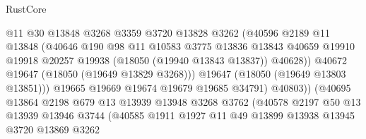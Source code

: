 \begin{lexlean}{RustCore}
\begin{coremodule}
                                  @11
                                  @30
                                  @13848
                                  @3268
                                  @3359
                                  @3720
                                  @13828
                                  @3262
                                  (@40596
                                    @2189
                                    @11
                                    @13848
                                    (@40646
                                      @190
                                      @98
                                      @11
                                      @10583
                                      @3775
                                      @13836
                                      @13843
                                      @40659
                                      @19910
                                      @19918
                                      @20257
                                      @19938
                                      (@18050 (@19940 @13843 @13837))
                                      @40628))
                                  @40672
                                  @19647
                                  (@18050 (@19649 @13829 @3268)))
                                @19647
                                (@18050 (@19649 @13803 @13851)))
                              @19665
                              @19669
                              @19674
                              @19679
                              @19685
                              @34791)
                            @40803))
                        (@40695
                          @13864
                          @2198
                          @679
                          @13
                          @13939
                          @13948
                          @3268
                          @3762
                          (@40578
                            @2197
                            @50
                            @13
                            @13939
                            @13946
                            @3744
                            (@40585
                              @1911
                              @1927
                              @11
                              @49
                              @13899
                              @13938
                              @13945
                              @3720
                              @13869
                              @3262

\end{coremodule}
\end{lexlean}
